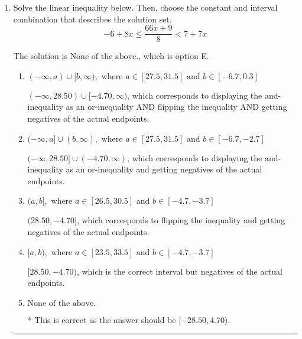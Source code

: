 \documentclass{extbook}[14pt]
\newcommand{\litem}[1]{\item #1

\rule{\textwidth}{0.4pt}}
\begin{document}
\begin{enumerate}
{\begin{enumerate}[label=\Alph*.]
This describes the values no more than 10 from 3
\item \( (-\infty, -7] \cup [13, \infty) \)

This describes the values no less than 10 from 3
\item \( (-7, 13) \)

This describes the values less than 10 from 3
\item \( \text{None of the above} \)

Options A-D described the values [more/less than] 10 units from 3, which is the reverse of what the question asked.
\end{enumerate}

\textbf{General Comment:} When thinking about this language, it helps to draw a number line and try points.
}
\litem{
Solve the linear inequality below. Then, choose the constant and interval combination that describes the solution set.
\[ -6 + 8 x \leq \frac{66 x + 9}{8} < 7 + 7 x \]

The solution is \( \text{None of the above.} \), which is option E.\begin{enumerate}[label=\Alph*.]
\item \( (-\infty, a) \cup [b, \infty), \text{ where } a \in [27.5, 31.5] \text{ and } b \in [-6.7, 0.3] \)

$(-\infty, 28.50) \cup [-4.70, \infty)$, which corresponds to displaying the and-inequality as an or-inequality AND flipping the inequality AND getting negatives of the actual endpoints.
\item \( (-\infty, a] \cup (b, \infty), \text{ where } a \in [27.5, 31.5] \text{ and } b \in [-6.7, -2.7] \)

$(-\infty, 28.50] \cup (-4.70, \infty)$, which corresponds to displaying the and-inequality as an or-inequality and getting negatives of the actual endpoints.
\item \( (a, b], \text{ where } a \in [26.5, 30.5] \text{ and } b \in [-4.7, -3.7] \)

$(28.50, -4.70]$, which corresponds to flipping the inequality and getting negatives of the actual endpoints.
\item \( [a, b), \text{ where } a \in [23.5, 33.5] \text{ and } b \in [-4.7, -3.7] \)

$[28.50, -4.70)$, which is the correct interval but negatives of the actual endpoints.
\item \( \text{None of the above.} \)

* This is correct as the answer should be $[-28.50, 4.70)$.
\end{enumerate}

}
\end{enumerate}
\end{document}
